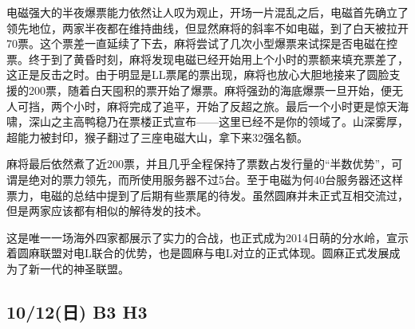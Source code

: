 电磁强大的半夜爆票能力依然让人叹为观止，开场一片混乱之后，电磁首先确立了领先地位，两家半夜都在维持曲线，但显然麻将的斜率不如电磁，到了白天被拉开70票。这个票差一直延续了下去，麻将尝试了几次小型爆票来试探是否电磁在控票。终于到了黄昏时刻，麻将发现电磁已经开始用上个小时的票额来填充票差了，这正是反击之时。由于明显是LL票尾的票出现，麻将也放心大胆地接来了圆脸支援的200票，随着白天囤积的票开始了爆票。麻将强劲的海底爆票一旦开始，便无人可挡，两个小时，麻将完成了追平，开始了反超之旅。最后一个小时更是惊天海啸，深山之主高鸭稳乃在票楼正式宣布——这里已经不是你的领域了。山深雾厚，超能力被封印，猴子翻过了三座电磁大山，拿下来32强名额。

麻将最后依然煮了近200票，并且几乎全程保持了票数占发行量的“半数优势”，可谓是绝对的票力领先，而所使用服务器不过5台。至于电磁为何40台服务器还这样票力，电磁的总结中提到了后期有些票尾的待发。虽然圆麻并未正式互相交流过，但是两家应该都有相似的解待发的技术。

这是唯一一场海外四家都展示了实力的合战，也正式成为2014日萌的分水岭，宣示着圆麻联盟对电L联合的优势，也是圆麻与电L对立的正式体现。圆麻正式发展成为了新一代的神圣联盟。

\subsection{10/12(日) B3 H3}


